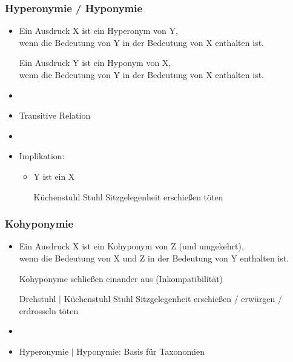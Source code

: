 \begin{frame}
\frametitle{Hyperonymie / Hyponymie}

\begin{itemize}
	\item 
Ein Ausdruck X ist ein Hyperonym von Y,\\
wenn die Bedeutung von Y in der Bedeutung von X enthalten ist.

Ein Ausdruck Y ist ein Hyponym von X,\\
wenn die Bedeutung von Y in der Bedeutung von X enthalten ist.
	\item[]	
	\item Transitive Relation
	\item[]
	\item Implikation: \ras
	
	\begin{itemize}
		\item Y ist ein X
		
		\eal 
		\ex Küchenstuhl \ras Stuhl \ras Sitzgelegenheit
		\ex erschie\ss{}en \ras töten
		\zl
		
	\end{itemize}
	
\end{itemize}

\end{frame}



\begin{frame}
\frametitle{Kohyponymie}

\begin{itemize}
\item
  Ein Ausdruck X ist ein Kohyponym von Z (und umgekehrt),\\
wenn die Bedeutung von X und Z in der Bedeutung von Y enthalten ist. 

Kohyponyme schließen einander aus (Inkompatibilität)

\eal
\ex Drehstuhl $|$ Küchenstuhl \ras Stuhl \ras Sitzgelegenheit
\ex erschießen / erwürgen / erdrosseln \ras töten
\zl


	\item[]
	\item Hyperonymie $|$ Hyponymie: Basis für Taxonomien

\end{itemize}

\end{frame}



